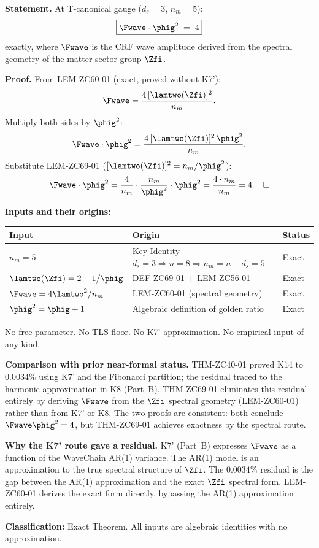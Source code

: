 \documentclass[12pt, a4paper]{article}
\begin{document}
\begin{formalbox}[title={THM-ZC69-01: K14 Exact Theorem ---
  $F\varphi_{\rm gold}^{2} = 4$ ($R_0$, Exact)}]

\textbf{Statement.}
At T-canonical gauge ($d_s = 3$, $n_m = 5$):
\begin{equation}
  \boxed{
    \Fwave \cdot \phig^{2} \;=\; 4
  }
  \label{eq:K14-exact}
\end{equation}
exactly, where $\Fwave$ is the CRF wave amplitude derived
from the spectral geometry of the matter-sector group $\Zfi$.

\textbf{Proof.}
From LEM-ZC60-01 (exact, proved without K7'):
\[
  \Fwave = \frac{4\,[\lamtwo(\Zfi)]^{2}}{n_m}.
\]
Multiply both sides by $\phig^{2}$:
\[
  \Fwave \cdot \phig^{2}
  = \frac{4\,[\lamtwo(\Zfi)]^{2}\,\phig^{2}}{n_m}.
\]
Substitute LEM-ZC69-01 ($[\lamtwo(\Zfi)]^{2} = n_m/\phig^{2}$):
\[
  \Fwave \cdot \phig^{2}
  = \frac{4}{n_m} \cdot \frac{n_m}{\phig^{2}} \cdot \phig^{2}
  = \frac{4 \cdot n_m}{n_m}
  = 4.
  \quad\square
\]

\textbf{Inputs and their origins:}
\begin{center}
{\small\renewcommand{\arraystretch}{1.3}
\begin{tabular}{@{}lll@{}}
\toprule
Input & Origin & Status \\
\midrule
$n_m = 5$ & Key Identity $d_s=3 \Rightarrow n=8 \Rightarrow n_m=n-d_s=5$ & Exact \\
$\lamtwo(\Zfi) = 2 - 1/\phig$ & DEF-ZC69-01 + LEM-ZC56-01 & Exact \\
$\Fwave = 4\lamtwo^2/n_m$ & LEM-ZC60-01 (spectral geometry) & Exact \\
$\phig^2 = \phig + 1$ & Algebraic definition of golden ratio & Exact \\
\bottomrule
\end{tabular}
}
\end{center}

No free parameter. No TLS floor. No K7' approximation.
No empirical input of any kind.

\textbf{Comparison with prior near-formal status.}
THM-ZC40-01 proved K14 to $0.0034\%$ using K7' and the
Fibonacci partition; the residual traced to the harmonic
approximation in K8 (Part~B).
THM-ZC69-01 eliminates this residual entirely
by deriving $\Fwave$ from the $\Zfi$ spectral geometry
(LEM-ZC60-01) rather than from K7' or K8.
The two proofs are consistent: both conclude $\Fwave\phig^2 = 4$,
but THM-ZC69-01 achieves exactness by the spectral route.

\textbf{Why the K7' route gave a residual.}
K7' (Part~B) expresses $\Fwave$ as a function of the
WaveChain AR(1) variance. The AR(1) model is an
approximation to the true spectral structure of $\Zfi$.
The $0.0034\%$ residual is the gap between the
AR(1) approximation and the exact $\Zfi$ spectral form.
LEM-ZC60-01 derives the exact form directly,
bypassing the AR(1) approximation entirely.

\textbf{Classification:} Exact Theorem.
All inputs are algebraic identities with no approximation.
\end{formalbox}
\end{document}
